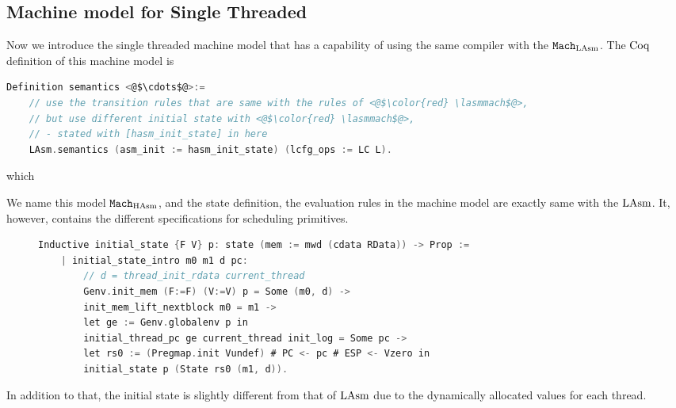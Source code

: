 \subsection{Machine model for Single Threaded}
\label{chapter:linking:subsec:machine-model-for-single-threaded}

Now we introduce the single threaded machine model that has a capability of
 using the same compiler with the ${\mathrm{\texttt{Mach}}}_{\mathrm{LAsm}}$. 
 The $\mathrm{Coq}$ definition of this machine model is 
\begin{lstlisting}[language=C]
  Definition semantics <@$\cdots$@>:=
    // use the transition rules that are same with the rules of <@$\color{red} \lasmmach$@>,
    // but use different initial state with <@$\color{red} \lasmmach$@>,
    // - stated with [hasm_init_state] in here
    LAsm.semantics (asm_init := hasm_init_state) (lcfg_ops := LC L).
\end{lstlisting}
which

 We name this model ${\mathrm{\texttt{Mach}}}_{\mathrm{HAsm}}$, 
 and the state definition, the evaluation rules in the machine model are 
 exactly same with the $\mathrm{LAsm}$. 
 It, however, contains the different specifications for scheduling primitives. 




\begin{figure}
\begin{lstlisting}[language=C]
  Inductive initial_state {F V} p: state (mem := mwd (cdata RData)) -> Prop :=
    | initial_state_intro m0 m1 d pc:        
        // d = thread_init_rdata current_thread
        Genv.init_mem (F:=F) (V:=V) p = Some (m0, d) ->
        init_mem_lift_nextblock m0 = m1 ->
        let ge := Genv.globalenv p in
        initial_thread_pc ge current_thread init_log = Some pc ->
        let rs0 := (Pregmap.init Vundef) # PC <- pc # ESP <- Vzero in
        initial_state p (State rs0 (m1, d)).
\end{lstlisting}
\end{figure}
 In addition to that, 
 the initial state is slightly different from that of $\mathrm{LAsm}$ 
 due to the dynamically allocated values for each thread.

